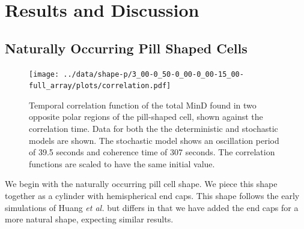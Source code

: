 \documentclass[10pt,letterpaper]{article}
\begin{document}


\section*{Results and Discussion}
\subsection*{Naturally Occurring Pill Shaped Cells}


\begin{figure}
  \begin{center}
    \texttt{[image: ../data/shape-p/3\_00-0\_50-0\_00-0\_00-15\_00-full\_array/plots/correlation.pdf]}
  \end{center}
  \caption{Temporal correlation function of the total MinD found in
    two opposite polar regions of the pill-shaped cell, shown against
    the correlation time.  Data for both the the deterministic and
    stochastic models are shown.  The stochastic model shows an
    oscillation period of 39.5 seconds and coherence time of 307 seconds.
    The correlation functions are scaled to have the same initial
    value.}
  \label{corr-pill}
\end{figure}

We begin with the naturally occurring pill cell shape.  We piece this
shape together as a cylinder with hemispherical end caps.  This shape
follows the early simulations of Huang \emph{et al.} but differs in
that we have added the end caps for a more natural shape, expecting
similar results.
\end{document}
